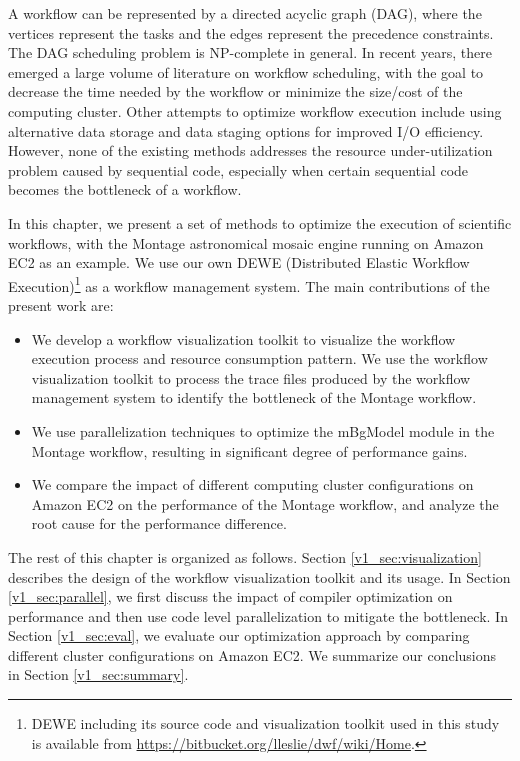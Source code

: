 A workflow can be represented by a directed acyclic graph (DAG), where the vertices represent the tasks and the edges represent the precedence constraints. The DAG scheduling problem is NP-complete in general. In recent years, there emerged a large volume of literature on workflow scheduling, with the goal to decrease the time needed by the workflow or minimize the size/cost of the computing cluster. Other attempts to optimize workflow execution include using alternative data storage and data staging options for improved I/O efficiency. However, none of the existing methods addresses the resource under-utilization problem caused by sequential code, especially when certain sequential code becomes the bottleneck of a workflow. 

In this chapter, we present a set of methods to optimize the execution of scientific workflows, with the Montage astronomical mosaic engine running on Amazon EC2 as an example. We use our own DEWE (Distributed Elastic Workflow Execution)\footnote{DEWE including its source code and visualization toolkit used in this study is available from \url{https://bitbucket.org/lleslie/dwf/wiki/Home}.} as a workflow management system. The main contributions of the present work are:

\begin{itemize}
	\item We develop a workflow visualization toolkit to visualize the workflow execution process and resource consumption pattern. We use the workflow visualization toolkit to process the trace files produced by the workflow management system to identify the bottleneck of the Montage workflow.
	\item We use parallelization techniques to optimize the mBgModel module in the Montage workflow, resulting in significant degree of performance gains.
	\item We compare the impact of different computing cluster configurations on Amazon EC2 on the performance of the Montage workflow, and analyze the root cause for the performance difference. 
\end{itemize}

The rest of this chapter is organized as follows. Section \ref{v1_sec:visualization} describes the design of the workflow visualization toolkit and its usage. In Section \ref{v1_sec:parallel}, we first discuss the impact of compiler optimization on performance and then use code level parallelization to mitigate the bottleneck. In Section \ref{v1_sec:eval}, we evaluate our optimization approach by comparing different cluster configurations on Amazon EC2. We summarize our conclusions in Section \ref{v1_sec:summary}.

